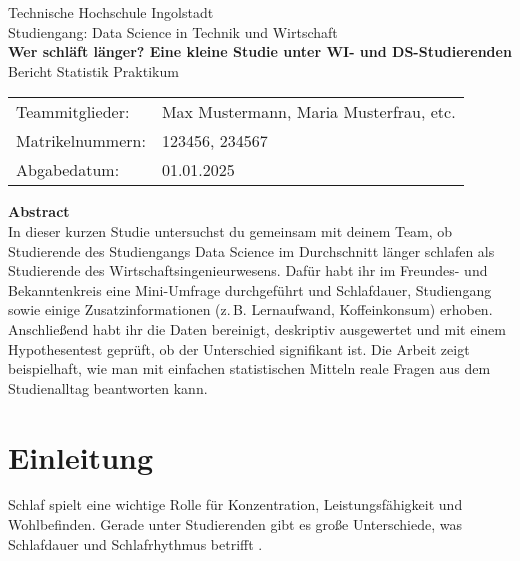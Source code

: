 \documentclass[12pt,a4paper]{article}
\begin{document}
\begin{titlepage}
  \centering
  {\Large Technische Hochschule Ingolstadt}\\[6pt]
  {\large Studiengang: Data Science in Technik und Wirtschaft}\\[28pt]

  {\LARGE \textbf{Wer schläft länger? Eine kleine Studie unter WI- und DS-Studierenden}}\\[32pt]

  {\large Bericht Statistik Praktikum}\\[24pt]

  \begin{tabular}{ll}
    Teammitglieder: & Max Mustermann, Maria Musterfrau, etc. \\
    Matrikelnummern: & 123456, 234567 \\ 
    Abgabedatum: & 01.01.2025 \\[32pt]
  \end{tabular}

  \begin{minipage}{0.85\textwidth}
    \textbf{Abstract} \\[4pt]
    In dieser kurzen Studie untersuchst du gemeinsam mit deinem Team, ob Studierende des Studiengangs Data Science im Durchschnitt länger schlafen als Studierende des Wirtschaftsingenieurwesens. Dafür habt ihr im Freundes- und Bekanntenkreis eine Mini-Umfrage durchgeführt und Schlafdauer, Studiengang sowie einige Zusatzinformationen (z.\,B. Lernaufwand, Koffeinkonsum) erhoben. Anschließend habt ihr die Daten bereinigt, deskriptiv ausgewertet und mit einem Hypothesentest geprüft, ob der Unterschied signifikant ist. Die Arbeit zeigt beispielhaft, wie man mit einfachen statistischen Mitteln reale Fragen aus dem Studienalltag beantworten kann.
  \end{minipage}

\end{titlepage}

\section{Einleitung}

Schlaf spielt eine wichtige Rolle für Konzentration, Leistungsfähigkeit und Wohlbefinden. 
Gerade unter Studierenden gibt es große Unterschiede, was Schlafdauer und Schlafrhythmus betrifft \citep{Mueller2023SchlafStudis}.  
\end{document}
